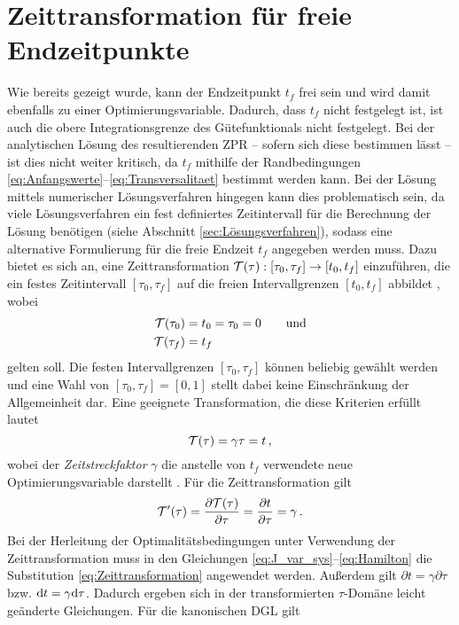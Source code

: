 \section{Zeittransformation für freie Endzeitpunkte}\label{sec:Zeittransformation}
Wie bereits gezeigt wurde, kann der Endzeitpunkt $t_f$ frei sein und wird damit ebenfalls zu einer Optimierungsvariable. Dadurch, dass $t_f$ nicht festgelegt ist, ist auch die obere Integrationsgrenze des Gütefunktionals nicht festgelegt. Bei der analytischen Lösung des resultierenden \gls{ZPR} -- sofern sich diese bestimmen lässt -- ist dies nicht weiter kritisch, da $t_f$ mithilfe der Randbedingungen \eqref{eq:Anfangswerte}--\eqref{eq:Transversalitaet} bestimmt werden kann. Bei der Lösung mittels numerischer Lösungsverfahren hingegen kann dies problematisch sein, da viele Lösungsverfahren ein fest definiertes Zeitintervall für die Berechnung der Lösung benötigen (siehe Abschnitt \ref{sec:Lösungsverfahren}), sodass eine alternative Formulierung für die freie Endzeit $t_f$ angegeben werden muss. Dazu bietet es sich an, eine Zeittransformation $\mathcal{T}(\tau): [\tau_0, \tau_f] \rightarrow [t_0, t_f]$ einzuführen, die ein festes Zeitintervall $[\tau_0, \tau_f]$ auf die freien Intervallgrenzen $[t_0, t_f]$ abbildet \cite{Gerdts.2010}, wobei 
\begin{align}
	\mathcal{T}(\tau_0) &= t_0 = \tau_0 = 0 \qquad \textrm{und} \\
	\mathcal{T}(\tau_f) &= t_f
\end{align}
gelten soll. Die festen Intervallgrenzen $[\tau_0, \tau_f]$ können beliebig gewählt werden und eine Wahl von $[\tau_0, \tau_f] = [0, 1]$ stellt dabei keine Einschränkung der Allgemeinheit dar. Eine geeignete Transformation, die diese Kriterien erfüllt lautet
\begin{equation}
	\mathcal{T}(\tau) = \gamma\tau = t\,, \label{eq:Zeittransformation}
\end{equation}
wobei der \textit{Zeitstreckfaktor} $\gamma$ die anstelle von $t_f$ verwendete neue Optimierungsvariable darstellt \cite{KnutGraichen.2012}. Für die Zeittransformation gilt 
\begin{equation}
	\mathcal{T}'(\tau) = \frac{\partial\mathcal{T}(\tau)}{\partial\tau} = \frac{\partial t}{\partial\tau} = \gamma\,.
\end{equation}
Bei der Herleitung der Optimalitätsbedingungen unter Verwendung der Zeittransformation muss in den Gleichungen \eqref{eq:J_var_sys}--\eqref{eq:Hamilton} die Substitution \eqref{eq:Zeittransformation} angewendet werden. Außerdem gilt $\partial t = \gamma\partial\tau$ bzw. $\textrm{d}{t} = \gamma\textrm{d}{\tau}$. Dadurch ergeben sich in der transformierten $\tau$-Domäne leicht geänderte Gleichungen. Für die kanonischen \gls{DGL} gilt 
